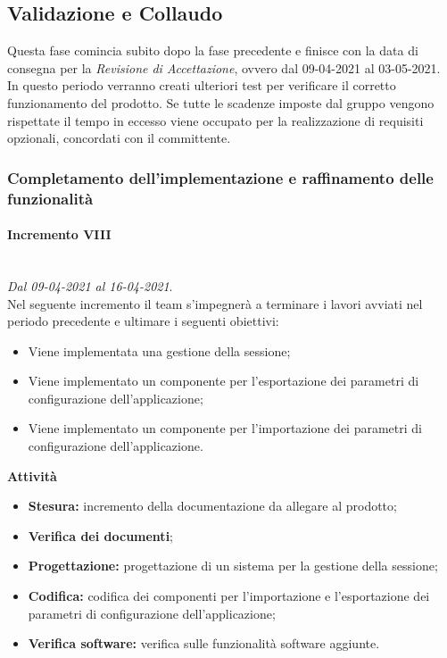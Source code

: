 \subsection{Validazione e Collaudo}
Questa fase comincia subito dopo la fase precedente e finisce con la data di consegna per la \textit{Revisione di Accettazione}, ovvero dal 09-04-2021 al 03-05-2021.\\
In questo periodo verranno creati ulteriori test per verificare il corretto funzionamento del prodotto. Se tutte le scadenze imposte dal gruppo vengono rispettate il tempo in eccesso viene occupato per la realizzazione di requisiti opzionali, concordati con il committente. 
\subsubsection{Completamento dell'implementazione e raffinamento delle funzionalità}
\paragraph{Incremento VIII}\textit{}\\
\textit{Dal 09-04-2021 al 16-04-2021}. \\ 
Nel seguente incremento il team s'impegnerà a terminare i lavori avviati nel periodo precedente e ultimare i seguenti obiettivi:
\begin{itemize}
	\item Viene implementata una gestione della sessione;
	\item Viene implementato un componente per l'esportazione dei parametri di configurazione dell'applicazione;
	\item Viene implementato un componente per l'importazione dei parametri di configurazione dell'applicazione.
\end{itemize}			
\textbf{Attività}			
\begin{itemize}
\item \textbf{Stesura:} incremento della documentazione da allegare al prodotto;
\item \textbf{Verifica dei documenti};
\item \textbf{Progettazione:} progettazione di un sistema per la gestione della sessione;
\item \textbf{Codifica:} codifica dei componenti per l'importazione e l'esportazione dei parametri di configurazione dell'applicazione;
\item \textbf{Verifica software:} verifica sulle funzionalità software aggiunte.
\end{itemize}
